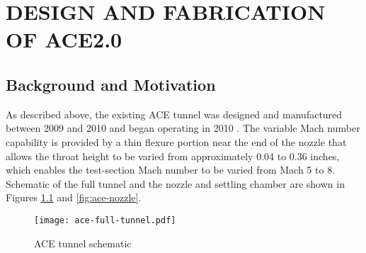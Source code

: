 %
%  
%



\chapter{DESIGN AND FABRICATION OF ACE2.0}

\section{Background and Motivation}

As described above, the existing ACE tunnel was designed and manufactured between 2009 and 2010 and began operating in 2010 \cite{ace09,ace10-calibrate,tichenor-dis}. The variable Mach number capability is provided by a thin flexure portion near the end of the nozzle that allows the throat height to be varied from approximately 0.04 to 0.36 inches, which enables the test-section Mach number to be varied from Mach 5 to 8. Schematic of the full tunnel and the nozzle and settling chamber are shown in Figures \ref{fig:ace-full-tunnel} and \ref{fig:ace-nozzle}.


\begin{figure}[ht!]
    \centering
    \texttt{[image: ace-full-tunnel.pdf]}
    \caption{ACE tunnel schematic}
    \label{fig:ace-full-tunnel}
\end{figure}

